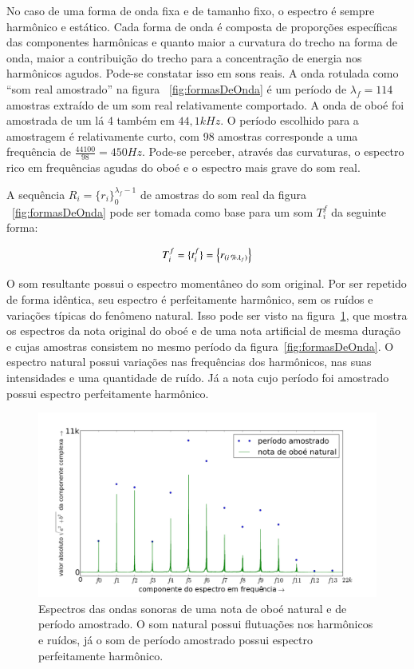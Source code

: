 No caso de uma forma de onda fixa e de tamanho fixo, o espectro é sempre harmônico e estático. Cada forma de onda é composta de proporções específicas das componentes harmônicas e 
quanto maior a curvatura do trecho na forma de onda, maior a contribuição do trecho para a
concentração de energia nos harmônicos agudos. Pode-se constatar isso em sons reais. A onda rotulada como ``som real amostrado'' na figura ~\ref{fig:formasDeOnda} é um período de $\lambda_f=114$ amostras extraído de um som real relativamente comportado. A onda de oboé foi amostrada de um lá 4 também em $44,1kHz$.
O período escolhido para a amostragem é relativamente curto, com 98 amostras corresponde a 
uma frequência de $\frac{44100}{98}=450 Hz$. Pode-se perceber, através das curvaturas, o espectro rico em 
frequências agudas do oboé e o espectro mais grave do som real.

A sequência 
$ R_i=\{ r_i \}_0^{\lambda_f-1}$ de amostras do som real da figura ~\ref{fig:formasDeOnda}
 pode ser tomada como base para um som $T_i^f$ da seguinte forma: 

\begin{equation}\label{sampleandoFormaDeOnda}
     T^f_i=\{ t_i^f \}=\Bigl\{ r_{(i\,\%\lambda_{f})} \Bigr\}
\end{equation}

O som resultante possui o espectro momentâneo do som original. Por ser repetido de forma idêntica,
seu espectro é perfeitamente harmônico, sem os ruídos e variações típicas do fenômeno natural. Isso pode ser 
visto na figura~\ref{fig:espectroOboe}, que mostra os espectros da nota original do oboé e de uma nota 
artificial de mesma duração e cujas amostras consistem no mesmo período da figura~\ref{fig:formasDeOnda}. O espectro natural possui variações nas frequências dos harmônicos, nas suas intensidades e uma quantidade de ruído. Já a nota cujo período foi amostrado possui espectro perfeitamente harmônico.



\begin{figure}[h!]
    \centering
        \includegraphics[width=\textwidth]{figuras/espectroOboeAmostradoNatural3}
    \caption{Espectros das ondas sonoras de uma nota de oboé natural e de período amostrado. O som natural possui flutuações nos harmônicos e ruídos, já o som de período amostrado possui espectro perfeitamente harmônico.}
        \label{fig:espectroOboe}
\end{figure}





